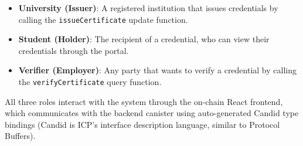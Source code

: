 \documentclass[journal]{IEEEtran}
\begin{document}
\begin{itemize}[leftmargin=*]
  \item \textbf{University (Issuer)}: A registered institution that issues credentials by calling the \texttt{issueCertificate} update function.
  \item \textbf{Student (Holder)}: The recipient of a credential, who can view their credentials through the portal.
  \item \textbf{Verifier (Employer)}: Any party that wants to verify a credential by calling the \texttt{verifyCertificate} query function.
\end{itemize}

All three roles interact with the system through the on-chain React frontend, which communicates with the backend canister using auto-generated Candid type bindings (Candid is ICP's interface description language, similar to Protocol Buffers).
\end{document}
